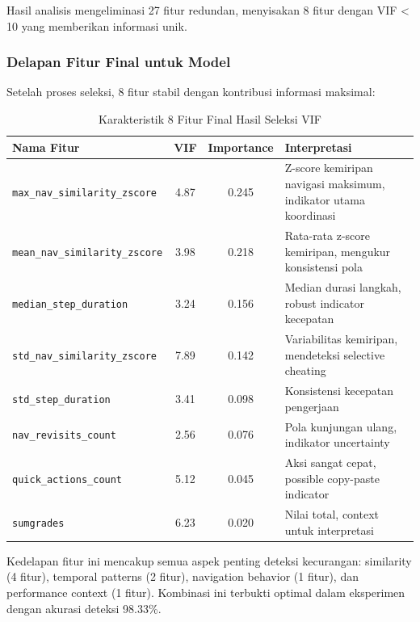 Hasil analisis mengeliminasi 27 fitur redundan, menyisakan 8 fitur dengan VIF < 10 yang memberikan informasi unik.

\subsubsection{Delapan Fitur Final untuk Model}
\label{sec:fiturFinal}

Setelah proses seleksi, 8 fitur stabil dengan kontribusi informasi maksimal:

\begin{table}[htbp]
\centering
\caption{Karakteristik 8 Fitur Final Hasil Seleksi VIF}
\label{tabel:fiturFinalKarakteristik}
\begin{tabular}{|p{5cm}|c|c|p{5cm}|}
\hline
\textbf{Nama Fitur} & \textbf{VIF} & \textbf{Importance} & \textbf{Interpretasi} \\
\hline
\texttt{max\_nav\_similarity\_zscore} & 4.87 & 0.245 & Z-score kemiripan navigasi maksimum, indikator utama koordinasi \\
\hline
\texttt{mean\_nav\_similarity\_zscore} & 3.98 & 0.218 & Rata-rata z-score kemiripan, mengukur konsistensi pola \\
\hline
\texttt{median\_step\_duration} & 3.24 & 0.156 & Median durasi langkah, robust indicator kecepatan \\
\hline
\texttt{std\_nav\_similarity\_zscore} & 7.89 & 0.142 & Variabilitas kemiripan, mendeteksi selective cheating \\
\hline
\texttt{std\_step\_duration} & 3.41 & 0.098 & Konsistensi kecepatan pengerjaan \\
\hline
\texttt{nav\_revisits\_count} & 2.56 & 0.076 & Pola kunjungan ulang, indikator uncertainty \\
\hline
\texttt{quick\_actions\_count} & 5.12 & 0.045 & Aksi sangat cepat, possible copy-paste indicator \\
\hline
\texttt{sumgrades} & 6.23 & 0.020 & Nilai total, context untuk interpretasi \\
\hline
\end{tabular}
\end{table}

Kedelapan fitur ini mencakup semua aspek penting deteksi kecurangan: similarity (4 fitur), temporal patterns (2 fitur), navigation behavior (1 fitur), dan performance context (1 fitur). Kombinasi ini terbukti optimal dalam eksperimen dengan akurasi deteksi 98.33\%.
